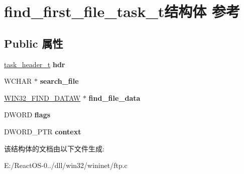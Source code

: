\hypertarget{structfind__first__file__task__t}{}\section{find\+\_\+first\+\_\+file\+\_\+task\+\_\+t结构体 参考}
\label{structfind__first__file__task__t}
\subsection*{Public 属性}
\begin{DoxyCompactItemize}
\item 
\mbox{\label{structfind__first__file__task__t_a3c5a6f02222e7d640cf7c7ac7f3e9ef2}} 
\hyperlink{structtask__header__t}{task\+\_\+header\+\_\+t} {\bfseries hdr}
\item 
\mbox{\label{structfind__first__file__task__t_a6abfecaf7e441a9af5696e4d710f9ed2}} 
W\+C\+H\+AR $\ast$ {\bfseries search\+\_\+file}
\item 
\mbox{\label{structfind__first__file__task__t_a6a00cbf405128cf8d4295714b6e5bcde}} 
\hyperlink{struct_w_i_n32___f_i_n_d___d_a_t_a_a}{W\+I\+N32\+\_\+\+F\+I\+N\+D\+\_\+\+D\+A\+T\+AW} $\ast$ {\bfseries find\+\_\+file\+\_\+data}
\item 
\mbox{\label{structfind__first__file__task__t_acf7a7493643e04f43f8f73350997946f}} 
D\+W\+O\+RD {\bfseries flags}
\item 
\mbox{\label{structfind__first__file__task__t_aba38d4829932f98ac000b11458580782}} 
D\+W\+O\+R\+D\+\_\+\+P\+TR {\bfseries context}
\end{DoxyCompactItemize}


该结构体的文档由以下文件生成\+:\begin{DoxyCompactItemize}
\item 
E\+:/\+React\+O\+S-\/0../dll/win32/wininet/ftp.\+c\end{DoxyCompactItemize}

